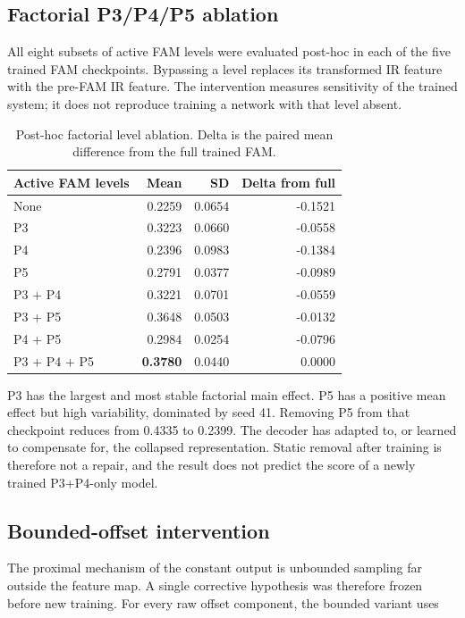 \subsection{Factorial P3/P4/P5 ablation}

All eight subsets of active FAM levels were evaluated post-hoc in each of the
five trained FAM checkpoints. Bypassing a level replaces its transformed IR
feature with the pre-FAM IR feature. The intervention measures sensitivity of
the trained system; it does not reproduce training a network with that level
absent.

\begin{table}[htbp]
  \centering
  \caption{Post-hoc factorial level ablation. Delta is the paired mean
  difference from the full trained FAM.}
  \label{tab:fam-level-ablation}
  \begin{tabular}{lrrr}
    \toprule
    Active FAM levels & Mean \mapfifty{} & SD & Delta from full \\
    \midrule
    None & 0.2259 & 0.0654 & -0.1521 \\
    P3 & 0.3223 & 0.0660 & -0.0558 \\
    P4 & 0.2396 & 0.0983 & -0.1384 \\
    P5 & 0.2791 & 0.0377 & -0.0989 \\
    P3 + P4 & 0.3221 & 0.0701 & -0.0559 \\
    P3 + P5 & 0.3648 & 0.0503 & -0.0132 \\
    P4 + P5 & 0.2984 & 0.0254 & -0.0796 \\
    P3 + P4 + P5 & \textbf{0.3780} & 0.0440 & 0.0000 \\
    \bottomrule
  \end{tabular}
\end{table}

P3 has the largest and most stable factorial main effect. P5 has a positive
mean effect but high variability, dominated by seed 41. Removing P5 from that
checkpoint reduces \mapfifty{} from 0.4335 to 0.2399. The decoder has adapted
to, or learned to compensate for, the collapsed representation. Static removal
after training is therefore not a repair, and the result does not predict the
score of a newly trained P3+P4-only model.

\subsection{Bounded-offset intervention}
\label{sec:bounded-fam}

The proximal mechanism of the constant output is unbounded sampling far
outside the feature map. A single corrective hypothesis was therefore frozen
before new training. For every raw offset component, the bounded variant uses

